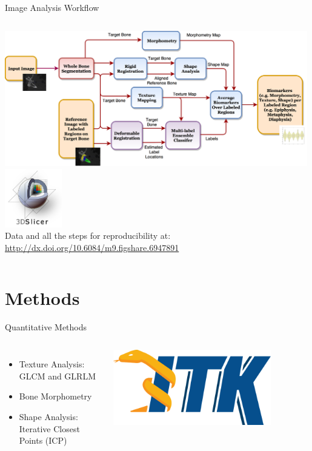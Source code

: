 \documentclass[10pt,aspectratio=169]{beamer}
\begin{document}
{
\begin{frame}{Image Analysis Workflow}
\begin{columns}[onlytextwidth]
      \includegraphics[width=0.99\textwidth]{figures/Automated_Processing_Pipeline.png}
        \centering
        \includegraphics[width=2.5cm]{logos/logo_slicer.png}\\
        \vspace{0.3cm}
        Data and all the steps for reproducibility at: \url{http://dx.doi.org/10.6084/m9.figshare.6947891}
\end{columns}
\end{frame}
}

\section{Methods}

\begin{frame}[fragile]{Quantitative Methods}
  \begin{columns}
    \centering
    \begin{itemize} \itemsep2em
      \item Texture Analysis: GLCM and GLRLM
      \item Bone Morphometry
      \item Shape Analysis: Iterative Closest Points (ICP)
    \end{itemize}
    \centering
    \includegraphics[width=0.8\textwidth]{./logos/logo_ITK.png}
  \end{columns}
\end{frame}
\end{document}
